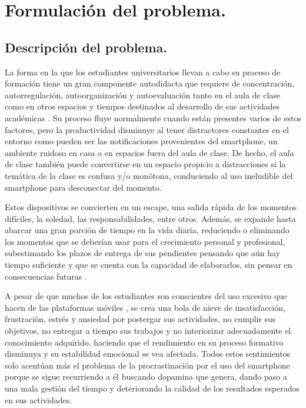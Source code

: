 \section{Formulaci\'on del problema.}

\subsection{Descripci\'on del problema.}

La forma en la que los estudiantes universitarios llevan a cabo su proceso de formación tiene un gran componente autodidacta que requiere de concentración, autorregulación, autoorganización y autoevaluación tanto en el aula de clase como en otros espacios y tiempos destinados al desarrollo de sus actividades académicas \cite{Rafaila2015}. Su proceso fluye normalmente cuando están presentes varios de estos factores, pero la productividad disminuye al tener distractores constantes en el entorno como pueden ser las notificaciones provenientes del smartphone, un ambiente ruidoso en casa o en espacios fuera del aula de clase. De hecho, el aula de clase también puede convertirse en un espacio propicio a distracciones si la temática de la clase es confusa y/o monótona, conduciendo al uso ineludible del smartphone para desconectar del momento.

Estos dispositivos se convierten en un escape, una salida rápida de los momentos difíciles, la soledad, las responsabilidades, entre otros. Además, se expande hasta abarcar una gran porción de tiempo en la vida diaria, reduciendo o eliminando los momentos que se deberían usar para el crecimiento personal y profesional, subestimando los plazos de entrega de sus pendientes pensando que aún hay tiempo suficiente y que se cuenta con la capacidad de elaborarlos, sin pensar en consecuencias futuras \cite{Lizbeth2023}.

A pesar de que muchos de los estudiantes son conscientes del uso excesivo que hacen de las plataformas móviles \cite{Giraldo2020, Beutel2016}, se crea una bola de nieve de insatisfacción, frustración, estrés y ansiedad por postergar sus actividades, no cumplir sus objetivos, no entregar a tiempo sus trabajos y no interiorizar adecuadamente el conocimiento adquirido, haciendo que el rendimiento en su proceso formativo disminuya y su estabilidad emocional se vea afectada. Todos estos sentimientos solo acentúan más el problema de la procrastinación por el uso del smartphone porque se sigue recurriendo a él buscando dopamina que genera, dando paso a una mala gestión del tiempo y deteriorando la calidad de los resultados esperados en sus actividades.

